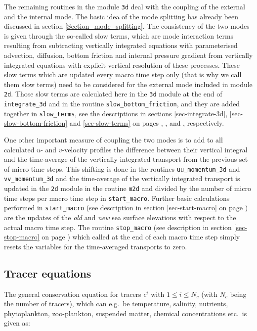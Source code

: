 The remaining routines in the module {\tt 3d} deal with the coupling of the
external and the internal mode. The basic idea of the mode splitting
has already been discussed in section \ref{Section_mode_splitting}.
The consistency of the two modes is given through the so-called
slow terms, which are mode interaction terms resulting from
subtracting vertically integrated equations with parameterised 
advection, diffusion, bottom friction and internal pressure 
gradient from vertically integrated equations with explicit vertical resolution
of these processes. These slow terms which are updated every macro
time step only (that is why we call them slow terms) need to be considered
for the external mode included in module {\tt 2d}.
Those slow terms are calculated here in the {\tt 3d} module at the end
of {\tt integrate\_3d} and in the routine {\tt slow\_bottom\_friction},
and they are added together in {\tt slow\_terms},
see the descriptions in sections \ref{sec-integrate-3d},
\ref{sec-slow-bottom-friction} and \ref{sec-slow-terms}
on pages \pageref{sec-integrate-3d}, \pageref{sec-slow-bottom-friction},
and \pageref{sec-slow-terms}, respectively.

One other important measure of coupling the two modes is to
add to all calculated $u$- and $v$-velocity profiles the difference 
between their vertical integral and the time-average of the 
vertically integrated transport from the previous set of micro time 
steps. This shifting is done in the routines {\tt uu\_momentum\_3d} and
{\tt vv\_momentum\_3d} and the  time-average of the
vertically integrated transport is updated in the {\tt 2d} module 
in the routine {\tt m2d} and divided by the number of
micro time steps per macro time step in {\tt start\_macro}. 
Further basic calculations performed in {\tt start\_macro}
(see description in section \ref{sec-start-macro} 
on page \pageref{sec-start-macro}) are the updates of
the {\it old} and {\it new} sea surface elevations with respect to 
the actual macro time step.
The routine {\tt stop\_macro} (see description in section \ref{sec-stop-macro}
on page \pageref{sec-stop-macro}) 
which called at the end of each macro time step
simply resets the variables for the time-averaged transports to zero. 

\subsection{Tracer equations}\label{Section_tracer}

The general conservation equation for tracers $c^i$ with $1\leq i \leq N_c$
(with $N_c$ being the number of tracers), 
which can e.g.\ be temperature,
salinity, nutrients, phytoplankton, zoo-plankton, suspended matter,
chemical concentrations etc.\ is given as:

